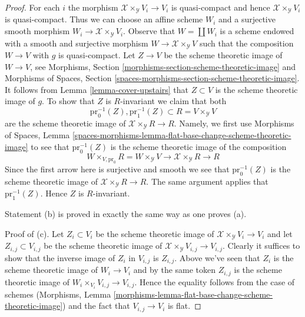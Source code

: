 \begin{proof}
\medskip\noindent
For each $i$ the morphism $\mathcal{X} \times_\mathcal{Y} V_i \to V_i$
is quasi-compact and hence $\mathcal{X} \times_\mathcal{Y} V_i$ is
quasi-compact. Thus we can choose an affine scheme $W_i$ and a
surjective smooth morphism $W_i \to \mathcal{X} \times_\mathcal{Y} V_i$.
Observe that $W = \coprod W_i$ is a scheme endowed with
a smooth and surjective morphism $W \to \mathcal{X} \times_\mathcal{Y} V$
such that the composition $W \to V$ with $g$ is quasi-compact.
Let $Z \to V$ be the scheme theoretic image of $W \to V$, see
Morphisms, Section
\ref{morphisms-section-scheme-theoretic-image} and
Morphisms of Spaces, Section
\ref{spaces-morphisms-section-scheme-theoretic-image}.
It follows from Lemma \ref{lemma-cover-upstairs}
that $Z \subset V$ is the scheme theoretic image of $g$.
To show that $Z$ is $R$-invariant we claim that both
$$
\text{pr}_0^{-1}(Z), \text{pr}_1^{-1}(Z) \subset R = V \times_\mathcal{Y} V
$$
are the scheme theoretic image of $\mathcal{X} \times_\mathcal{Y} R \to R$.
Namely, we first use Morphisms of Spaces, Lemma
\ref{spaces-morphisms-lemma-flat-base-change-scheme-theoretic-image}
to see that $\text{pr}_0^{-1}(Z)$ is the scheme theoretic image
of the composition
$$
W \times_{V, \text{pr}_0} R = W \times_\mathcal{Y} V \to
\mathcal{X} \times_\mathcal{Y} R \to R
$$
Since the first arrow here is surjective and smooth we see that
$\text{pr}_0^{-1}(Z)$ is the scheme theoretic image of
$\mathcal{X} \times_\mathcal{Y} R \to R$. The same argument applies
that $\text{pr}_1^{-1}(Z)$. Hence $Z$ is $R$-invariant.

\medskip\noindent
Statement (b) is proved in exactly the same way as one proves (a).

\medskip\noindent
Proof of (c). Let $Z_i \subset V_i$ be the scheme theoretic image
of $\mathcal{X} \times_\mathcal{Y} V_i \to V_i$ and let
$Z_{i, j} \subset V_{i, j}$ be the scheme theoretic image of
$\mathcal{X} \times_\mathcal{Y} V_{i, j} \to V_{i, j}$.
Clearly it suffices to show that the inverse image of $Z_i$
in $V_{i, j}$ is $Z_{i, j}$. Above we've seen that
$Z_i$ is the scheme theoretic image of $W_i \to V_i$
and by the same token $Z_{i, j}$ is the scheme theoretic
image of $W_i \times_{V_i} V_{i, j} \to V_{i, j}$.
Hence the equality follows from the case of schemes
(Morphisms, Lemma
\ref{morphisms-lemma-flat-base-change-scheme-theoretic-image})
and the fact that $V_{i, j} \to V_i$ is flat.
\end{proof}
